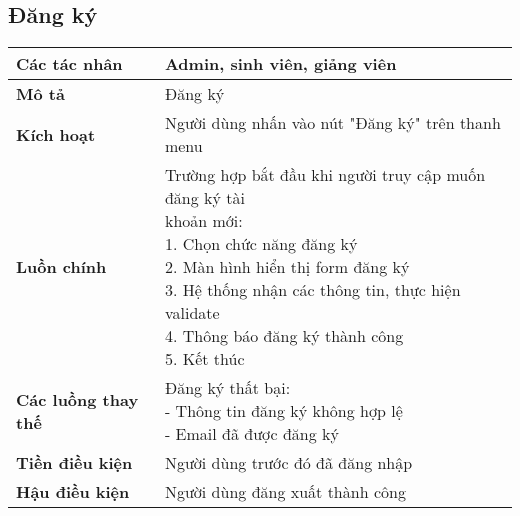 \subsection*{Đăng ký}
	\begin{tabular}{|l|p{}|}
		\hline
		\textbf{Các tác nhân}       & Admin, sinh viên, giảng viên                                        \\
		\hline
		\textbf{Mô tả}              & Đăng ký                                                             \\
		\hline
		\textbf{Kích hoạt}          & Người dùng nhấn vào nút "Đăng ký" trên thanh menu                   \\
		\hline
		\textbf{Luồn chính}         & \makecell[l]{Trường hợp bắt đầu khi người truy cập muốn đăng ký tài \\khoản mới: \\ 1. Chọn chức năng đăng ký \\ 2. Màn hình hiển thị form đăng ký \\ 3. Hệ thống nhận các thông tin, thực hiện validate \\ 4. Thông báo đăng ký thành công \\ 5. Kết thúc} \\
		\hline
		\textbf{Các luồng thay thế} & \makecell[l]{Đăng ký thất bại:                                      \\ - Thông tin đăng ký không hợp lệ \\ - Email đã được đăng ký} \\
		\hline
		\textbf{Tiền điều kiện}     & Người dùng trước đó đã đăng nhập                                    \\
		\hline
		\textbf{Hậu điều kiện}      & Người dùng đăng xuất thành công                                     \\
		\hline
	\end{tabular}

